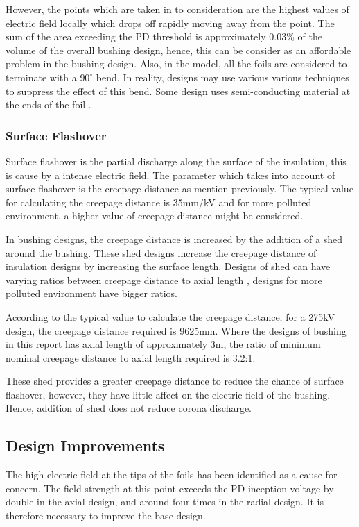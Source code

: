 However, the points which are taken in to consideration are the highest values of electric field locally which drops off rapidly moving away from the point. The sum of the area exceeding the PD threshold is approximately 0.03\% of the volume of the overall bushing design, hence, this can be consider as an affordable problem in the bushing design. Also, in the model, all the foils are considered to terminate with a $90^\circ$ bend. In reality, designs may use various various techniques to suppress the effect of this bend. Some design uses semi-conducting material at the ends of the foil \cite{kuffel2000high}.

\subsubsection{Surface Flashover}
Surface flashover is the partial discharge along the surface of the insulation, this is cause by a intense electric field. The parameter which takes into account of surface flashover is the creepage distance as mention previously. The typical value for calculating the creepage distance is 35mm/kV %
and for more polluted environment, a higher value of creepage distance might be considered.

In bushing designs, the creepage distance is increased by the addition of a shed around the bushing. These shed designs increase the creepage distance of insulation designs by increasing the surface length.  Designs of shed can have varying ratios between creepage distance to axial length \cite{shed}, designs for more polluted environment have bigger ratios.

According to the typical value to calculate the creepage distance, for a 275kV design, the creepage distance required is 9625mm. Where the designs of bushing in this report has axial length of approximately 3m, the ratio of minimum nominal creepage distance to axial length required is 3.2:1.

These shed provides a greater creepage distance to reduce the chance of surface flashover, however, they have little affect on the electric field of the bushing. Hence, addition of shed does not reduce corona discharge. 

\subsection{Design Improvements}
The high electric field at the tips of the foils has been identified as a cause for concern.
The field strength at this point exceeds the PD inception voltage by double in the axial design, and around four times in the radial design.
It is therefore necessary to improve the base design.

